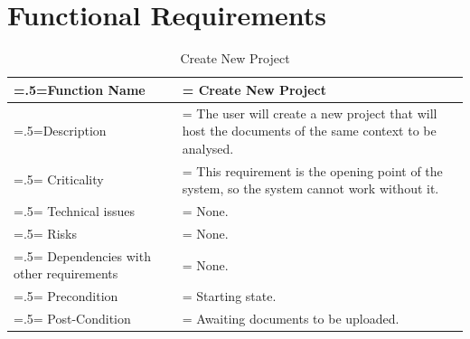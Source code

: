 \documentclass[12pt]{article}
\begin{document}
\section{Functional Requirements}
\begin{center}
    \begin{table}[H]
        \caption{Create New Project}
        \begin{tabularx}{\textwidth} {
                | >{\raggedright\arraybackslash\hsize=.5\hsize\linewidth=\hsize}X
                | >{\raggedright\arraybackslash\hsize=1.5\hsize\linewidth=\hsize}X |}
            \hline
            Function Name                        & Create New Project                                                                                  \\ \hline
            Description                          & The user will create a new project that will host the documents of the same context to be analysed. \\ \hline
            Criticality                          & This requirement is the opening point of the system, so the system cannot work without it.          \\ \hline
            Technical issues                     & None.                                                                                               \\ \hline
            Risks                                & None.                                                                                               \\ \hline
            Dependencies with other requirements & None.                                                                                               \\ \hline
            Precondition                         & Starting state.                                                                                     \\ \hline
            Post-Condition                       & Awaiting documents to be uploaded.                                                                  \\ \hline
        \end{tabularx}
    \end{table}
\end{center}
\end{document}
